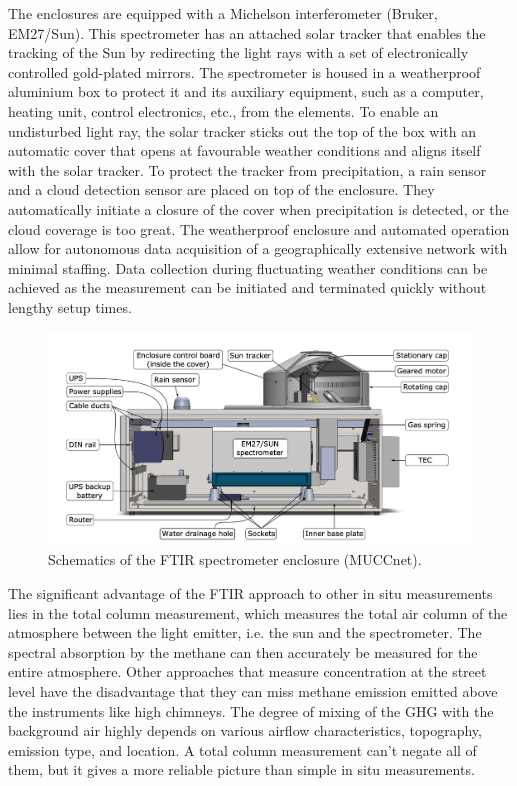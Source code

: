 The enclosures are equipped with a Michelson interferometer (Bruker, EM27/Sun). This spectrometer has an attached solar tracker that enables the tracking of the Sun by redirecting the light rays with a set of electronically controlled gold-plated mirrors. The spectrometer is housed in a weatherproof aluminium box to protect it and its auxiliary equipment, such as a computer, heating unit, control electronics, etc., from the elements. To enable an undisturbed light ray, the solar tracker sticks out the top of the box with an automatic cover that opens at favourable weather conditions and aligns itself with the solar tracker. To protect the tracker from precipitation, a rain sensor and a cloud detection sensor are placed on top of the enclosure. They automatically initiate a closure of the cover when precipitation is detected, or the cloud coverage is too great. The weatherproof enclosure and automated operation allow for autonomous data acquisition of a geographically extensive network with minimal staffing. Data collection during fluctuating weather conditions can be achieved as the measurement can be initiated and terminated quickly without lengthy setup times.
\begin{figure}[htbp]
 \centering
 \includegraphics[width=1\textwidth]{figures/Methode/FTIR_Enclousure_schematics.png}
 \caption[FTIR spectrometer enclosure schematics]{Schematics of the FTIR spectrometer enclosure (MUCCnet). \cite{Heinle.2018}}
 \label{FTIRSchematics}
\end{figure}
The significant advantage of the FTIR approach to other in situ measurements lies in the total column measurement, which measures the total air column of the atmosphere between the light emitter, i.e. the sun and the spectrometer. The spectral absorption by the methane can then accurately be measured for the entire atmosphere. Other approaches that measure concentration at the street level have the disadvantage that they can miss methane emission emitted above the instruments like high chimneys. The degree of mixing of the GHG with the background air highly depends on various airflow characteristics, topography, emission type, and location. A total column measurement can’t negate all of them, but it gives a more reliable picture than simple in situ measurements. 


